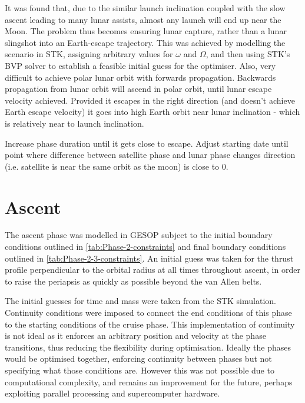 It was found that, due to the similar launch inclination coupled with the slow ascent leading to many lunar assists, almost any launch will end up near the Moon. The problem thus becomes ensuring lunar capture, rather than a lunar slingshot into an Earth-escape trajectory. This was achieved by modelling the scenario in STK, assigning arbitrary values for $\omega$ and $\Omega$, and then using STK's BVP solver to establish a feasible initial guess for the optimiser. 
Also, very difficult to achieve polar lunar orbit with forwards propagation. Backwards propagation from lunar orbit will ascend in polar orbit, until lunar escape velocity achieved. Provided it escapes in the right direction (and doesn't achieve Earth escape velocity) it goes into high Earth orbit near lunar inclination - which is relatively near to launch inclination.

Increase phase duration until it gets close to escape.
Adjust starting date until point where difference between satellite phase and lunar phase changes direction (i.e. satellite is near the same orbit as the moon) is close to 0\degrees.


\section{Ascent} \label{sec:Ascent}
The ascent phase was modelled in GESOP subject to the initial boundary conditions outlined in \autoref{tab:Phase-2-constraints} and final boundary conditions outlined in \autoref{tab:Phase-2-3-constraints}. An initial guess was taken for the thrust profile perpendicular to the orbital radius at all times throughout ascent, in order to raise the periapsis as quickly as possible beyond the van Allen belts.

The initial guesses for time and mass were taken from the STK simulation. Continuity conditions were imposed to connect the end conditions of this phase to the starting conditions of the cruise phase. This implementation of continuity is not ideal as it enforces an arbitrary position and velocity at the phase transitions, thus reducing the flexibility during optimisation. Ideally the phases would be optimised together, enforcing continuity between phases but not specifying what those conditions are. However this was not possible due to computational complexity, and remains an improvement for the future, perhaps exploiting parallel processing and supercomputer hardware.

